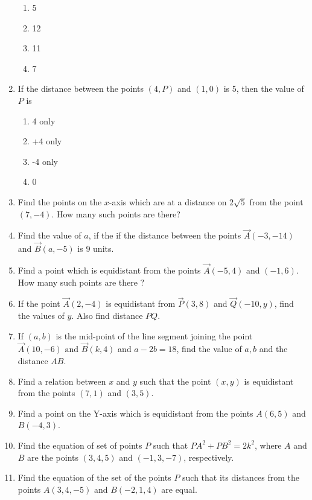 \begin{enumerate}[label=\thesubsection.\arabic*, ref=\thesubsection.\theenumi]
\begin{enumerate}
\item 5
\item 12
\item 11
\item 7
\end{enumerate}
\item If the distance between the points $(4, P)$  and $ (1, 0)$ is 5, then the value of ${P}$ is
\begin{enumerate}                       
\item4 only
\item+4 only
\item-4 only
\item0
\end{enumerate}
\item Find the points on the $x$-axis which are at a distance on $2\sqrt{5}$ from the point $ (7, -4).$ How many such points are there?
\item Find the value of $a$,  if the if the distance between the points $\vec{A}(-3, -14)$  and $\vec{B}(a, -5)$ is 9 units.
\item Find a point which is equidistant from the points $\vec{A}(-5, 4)$  and $(-1, 6)$.  How many such points are there ?
\item If the point $\vec{A}(2, -4)$ is equidistant from $\vec{P}(3, 8)$  and $\vec{Q}(-10, y)$,  find the values of $y$.  Also find distance $PQ$.
\item If $(a, b)$ is the mid-point of the line segment joining the point $\vec{A}(10, -6)\text{ and }\vec{B}(k, 4)$ and $a-2b=18$,  find the value of $a, b$ and the distance $AB$.
\item Find a relation between $x$ and $y$ such that the point $(x,y)$ is equidistant from the points $(7,1)$ and $(3,5)$.
\item Find a point on the Y-axis which is equidistant from the points $A(6,5)$ and $B(-4,3)$.
\item Find the equation of set of points $P$ such that $PA^2+PB^2=2k^2$, where $A$ and $B$ are the points $(3,4,5)$ and $(-1,3,-7)$, respectively.
\item Find the equation of the set of the points $P$ such that its distances from the points $A(3,4,-5)$ and $B(-2,1,4)$ are equal.
\end{enumerate}

